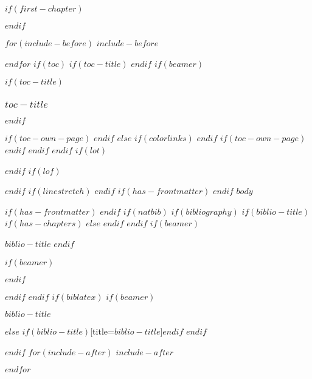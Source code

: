 \documentclass[
$if(fontsize)$
  $fontsize$,
$endif$
$if(lang)$
  $babel-lang$,
$endif$
$if(papersize)$
  $papersize$paper,
$else$
  paper=a4,
$endif$
$if(beamer)$
  ignorenonframetext,
$if(handout)$
  handout,
$endif$
$if(aspectratio)$
  aspectratio=$aspectratio$,
$endif$
$endif$
$for(classoption)$
  $classoption$$sep$,
$endfor$
,captions=tableheading
]{$if(beamer)$$documentclass$$else$$if(book)$scrbook$else$scrartcl$endif$$endif$}
\newif\ifbibliography
\begin{document}
$if(first-chapter)$
\setcounter{chapter}{$first-chapter$}
\addtocounter{chapter}{-1}
$endif$

$for(include-before)$
$include-before$

$endfor$
$if(toc)$
$if(toc-title)$
\renewcommand*\contentsname{$toc-title$}
$endif$
$if(beamer)$
\begin{frame}
$if(toc-title)$
  \frametitle{$toc-title$}
$endif$
  \tableofcontents[hideallsubsections]
\end{frame}
$if(toc-own-page)$
\newpage
$endif$
$else$
{
$if(colorlinks)$
\hypersetup{linkcolor=$if(toccolor)$$toccolor$$else$$endif$}
$endif$
\setcounter{tocdepth}{$if(toc-depth)$$toc-depth$$else$3$endif$}
\tableofcontents
$if(toc-own-page)$
\newpage
$endif$
}
$endif$
$endif$
$if(lot)$
\listoftables
$endif$
$if(lof)$
\listoffigures
$endif$
$if(linestretch)$
$endif$
$if(has-frontmatter)$
\mainmatter
$endif$
$body$

$if(has-frontmatter)$
\backmatter
$endif$
$if(natbib)$
$if(bibliography)$
$if(biblio-title)$
$if(has-chapters)$
\renewcommand\bibname{$biblio-title$}
$else$
\renewcommand\refname{$biblio-title$}
$endif$
$endif$
$if(beamer)$
\begin{frame}[allowframebreaks]{$biblio-title$}
  \bibliographytrue
$endif$
  
$if(beamer)$
\end{frame}
$endif$

$endif$
$endif$
$if(biblatex)$
$if(beamer)$
\begin{frame}[allowframebreaks]{$biblio-title$}
  \bibliographytrue
  \printbibliography[heading=none]
\end{frame}
$else$
\printbibliography$if(biblio-title)$[title=$biblio-title$]$endif$
$endif$

$endif$
$for(include-after)$
$include-after$

$endfor$
\end{document}
